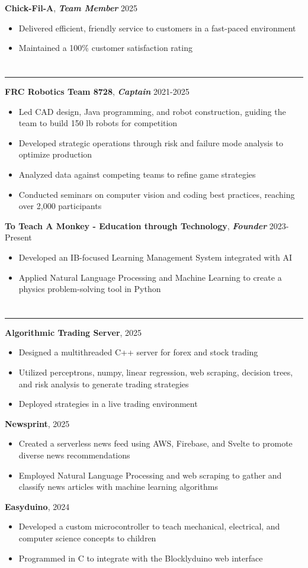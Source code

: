 \documentclass{article}[11pt]
\newcommand{\underlinedsection}[1]{ \section*{\sc{#1}}
	\rule{\textwidth}{1pt} }
\newenvironment{denseitemize}
{ \begin{itemize}[leftmargin = 20pt, topsep = 0pt, itemsep = 0pt] }
{\end{itemize} }
\newcommand{\job}[3]{ {\textbf{#1}, \textit{\textbf{#2}} \hfill {#3}} }
\begin{document}
\job{Chick-Fil-A}{Team Member}{2025}
\begin{denseitemize}
	\item Delivered efficient, friendly service to customers in a fast-paced environment
        \item Maintained a 100\% customer satisfaction rating

\end{denseitemize}

\underlinedsection{Other Experience}
\job{FRC Robotics Team 8728}{Captain}{2021-2025}
\begin{denseitemize}
	\item Led CAD design, Java programming, and robot construction, guiding the team to build 150 lb robots for competition
    \item Developed strategic operations through risk and failure mode analysis to optimize production
    \item Analyzed data against competing teams to refine game strategies
    \item Conducted seminars on computer vision and coding best practices, reaching over 2,000 participants
\end{denseitemize}
\job{To Teach A Monkey - Education through Technology}{Founder}{2023-Present}
\begin{denseitemize}
	\item Developed an IB-focused Learning Management System integrated with AI
    \item Applied Natural Language Processing and Machine Learning to create a physics problem-solving tool in Python
\end{denseitemize}
\underlinedsection{Projects}
\job{Algorithmic Trading Server}{}{2025}
\begin{denseitemize}
	\item Designed a multithreaded C++ server for forex and stock trading
    \item Utilized perceptrons, numpy, linear regression, web scraping, decision trees, and risk analysis to generate trading strategies
    \item Deployed strategies in a live trading environment
\end{denseitemize}
\job{Newsprint}{}{2025}
\begin{denseitemize}
	\item Created a serverless news feed using AWS, Firebase, and Svelte to promote diverse news recommendations
    \item Employed Natural Language Processing and web scraping to gather and classify news articles with machine learning algorithms
\end{denseitemize}
\job{Easyduino}{}{2024}
\begin{denseitemize}
	\item Developed a custom microcontroller to teach mechanical, electrical, and computer science concepts to children
    \item Programmed in C to integrate with the Blocklyduino web interface
\end{denseitemize}
\end{document}
